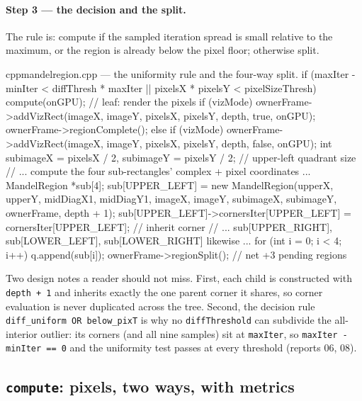 \documentclass[
	english,
	letterpaper, oneside
]{article}
\begin{document}
\paragraph{Step 3 --- the decision and the split.} The rule is: compute if the
sampled iteration spread is small relative to the maximum, or the region is
already below the pixel floor; otherwise split.

\begin{sourcecode}{cpp}{mandelregion.cpp --- the uniformity rule and the four-way split.}
if (maxIter - minIter < diffThresh * maxIter || pixelsX * pixelsY < pixelSizeThresh) {
    compute(onGPU);                                 // leaf: render the pixels
    if (vizMode) ownerFrame->addVizRect({imageX, imageY, pixelsX, pixelsY,
                                         depth, true, onGPU});
    ownerFrame->regionComplete();
} else {
    if (vizMode) ownerFrame->addVizRect({imageX, imageY, pixelsX, pixelsY,
                                         depth, false, onGPU});
    int subimageX = pixelsX / 2, subimageY = pixelsY / 2;   // upper-left quadrant size
    // ... compute the four sub-rectangles' complex + pixel coordinates ...
    MandelRegion *sub[4];
    sub[UPPER_LEFT]  = new MandelRegion(upperX, upperY, midDiagX1, midDiagY1,
                                        imageX, imageY, subimageX, subimageY,
                                        ownerFrame, depth + 1);
    sub[UPPER_LEFT]->cornersIter[UPPER_LEFT] = cornersIter[UPPER_LEFT]; // inherit corner
    // ... sub[UPPER_RIGHT], sub[LOWER_LEFT], sub[LOWER_RIGHT] likewise ...
    for (int i = 0; i < 4; i++) q.append(sub[i]);
    ownerFrame->regionSplit();                      // net +3 pending regions
}
\end{sourcecode}

Two design notes a reader should not miss. First, each child is constructed with
\texttt{depth + 1} and inherits exactly the one parent corner it shares, so corner
evaluation is never duplicated across the tree. Second, the decision rule
\texttt{diff\_uniform OR below\_pixT} is why no \texttt{diffThreshold} can subdivide
the all-interior outlier: its corners (and all nine samples) sit at
\texttt{maxIter}, so \texttt{maxIter - minIter == 0} and the uniformity test passes
at every threshold (reports 06, 08).

\subsection{\texttt{compute}: pixels, two ways, with metrics}
\end{document}

